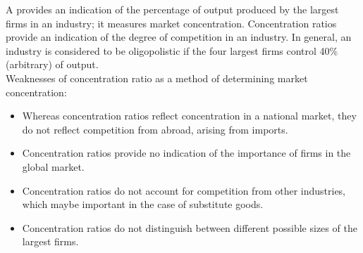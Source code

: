 A  provides an indication of the percentage of output produced by the largest firms in an industry; it measures market concentration.
Concentration ratios provide an indication of the degree of competition in an industry. In general, an industry is considered to be oligopolistic if the four largest firms control 40\% (arbitrary) of output.\\
Weaknesses of concentration ratio as a method of determining market concentration:
\begin{itemize}
  \item Whereas concentration ratios reflect concentration in a national market, they do not reflect competition from abroad, arising from imports.
  \item Concentration ratios provide no indication of the importance of firms in the global market.
  \item Concentration ratios do not account for competition from other industries, which maybe important in the case of substitute goods.
  \item Concentration ratios do not distinguish between different possible sizes of the largest firms.
\end{itemize}
